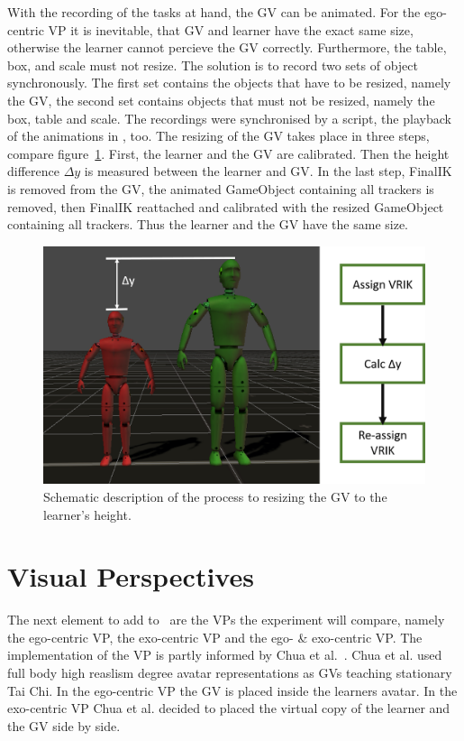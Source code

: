 With the recording of the tasks at hand, the GV can be animated. For the ego-centric VP it is inevitable, that GV and learner have the exact same size, otherwise the learner cannot percieve the GV correctly. Furthermore, the table, box, and scale must not resize. The solution is to record two sets of object synchronously. The first set contains the objects that have to be resized, namely the GV, the second set contains objects that must not be resized, namely the box, table and scale. The recordings were synchronised by a script, the playback of the animations in \exgo, too. The resizing of the GV takes place in three steps, compare figure~\ref{fig:resize}. First, the learner and the GV are calibrated. Then the height difference $\Delta y$ is measured between the learner and GV. In the last step, FinalIK is removed from the GV, the animated GameObject containing all trackers is removed, then FinalIK reattached and calibrated with the resized GameObject containing all trackers. Thus the learner and the GV have the same size.
\begin{figure}[htb]
	\centering
	\includegraphics[width=\textwidth]{figures/resize.png}
	\caption[Resizing the GV to the learner's height.]{Schematic description of the process to resizing the GV to the learner's height.}
	\label{fig:resize}
\end{figure}

\section{Visual Perspectives}
\label{sec:perspectives}
The next element to add to \exgo\ are the VPs the experiment will compare, namely the ego-centric VP, the exo-centric VP and the ego- \& exo-centric VP. The implementation of the VP is partly informed by Chua et al.~\cite{thaichichua}. Chua et al. used full body high reaslism degree avatar representations as GVs teaching stationary Tai Chi. In the ego-centric VP the GV is placed inside the learners avatar. In the exo-centric VP Chua et al. decided to placed the virtual copy of the learner and the GV side by side.\\

